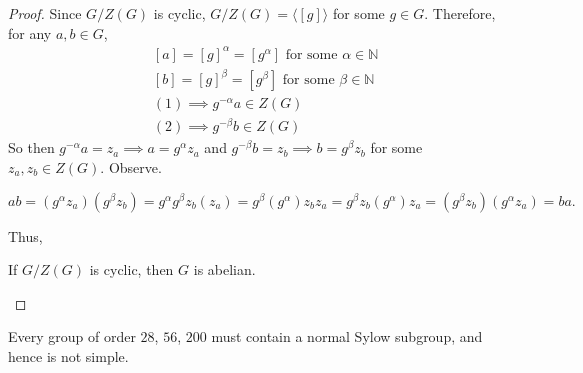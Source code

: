 \documentclass[addpoints,10pt]{exam}
\theoremstyle{plain}
\theoremstyle{definition}
\newtheorem{prob}[thm]{Problem}
\theoremstyle{plain}
\theoremstyle{plain}
\theoremstyle{definition}
\let\oldprob\prob
\let\endoldprob\endprob
\renewenvironment{prob}
  {\begin{singlespace}\oldprob}
  {\endoldprob\end{singlespace}}
\newcommand{\belowtitle}{\leavevmode\newline}
\newcommand{\NN}{\ensuremath{\mathbb{N}}}
\begin{document}
\begin{proof}
  Since $G/Z(G)$ is cyclic, $G/Z(G)=\langle [g]\rangle$ for some $g\in G$. Therefore, for any $a,b\in G$,
  \begin{align}
  &[a]=[g]^{\alpha}=[g^{\alpha}]\text{ for some }\alpha\in \NN\\
  &[b]=[g]^{\beta}=[g^{\beta}]\text{ for some }\beta\in \NN\\
  &(1)\implies g^{-\alpha}a\in Z(G)\\
  &(2)\implies g^{-\beta}b\in Z(G)
  \end{align}
  So then $g^{-\alpha}a=z_{a}\implies a=g^{\alpha}z_{a}$ and $g^{-\beta}b=z_{b}\implies b=g^{\beta}z_{b}$ for some $z_{a},z_{b}\in Z(G)$. Observe.
  \begin{center}
  $ab=(g^{\alpha}z_{a})(g^{\beta}z_{b})=g^{\alpha}g^{\beta}z_{b}(z_{a})=g^{\beta}(g^{\alpha})z_{b}z_{a}=g^{\beta}z_{b}(g^{\alpha})z_{a}=(g^{\beta}z_{b})(g^{\alpha}z_{a})=ba.$
  \end{center}
  Thus,
  \begin{center}
  If $G/Z(G)$ is cyclic, then $G$ is abelian.
  \end{center}
\end{proof}
\newpage
\begin{prob}\belowtitle Every group of order $28$, $56$, $200$ must contain a normal Sylow subgroup, and hence is not simple.\end{prob}
\end{document}
